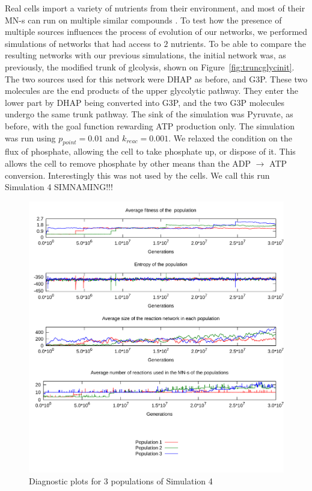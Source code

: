 \documentclass[a4paper,12pt]{article}
\begin{document}
Real cells import a variety of nutrients from their environment, and most of their MN-s can run on multiple similar compounds \cite{latent}. To test how the presence of multiple sources influences the process of evolution of our networks, we performed simulations of networks that had access to $2$ nutrients. To be able to compare the resulting networks with our previous simulations, the initial network was, as previously, the modified trunk of glcolysis, shown on Figure~\ref{fig:truncglycinit}. The two sources used for this network were DHAP as before, and G3P. These two molecules are the end products of the upper glycolytic pathway. They enter the lower part by DHAP being converted into G3P, and the two G3P molecules undergo the same trunk pathway. The sink of the simulation was Pyruvate, as before, with the goal function rewarding ATP production only. The simulation was run using $p_{point}=0.01$ and $k_{reac}=0.001$. We relaxed the condition on the flux of phosphate, allowing the cell to take phosphate up, or dispose of it. This allows the cell to remove phosphate by other means than the ADP $\rightarrow$ ATP conversion. Interestingly this was not used by the cells. We call this run Simulation 4 SIMNAMING!!!

\begin{figure}[htpb]
	\centering
	\includegraphics[width=1\linewidth]{simulationmultisource.pdf}
	\caption{Diagnostic plots for 3 populations of Simulation 4}
	\label{fig:simulationmultisource}
\end{figure}
\end{document}
